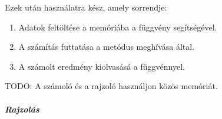 Ezek ut\'an haszn\'alatra k\'esz, amely sorrendje:
\begin{enumerate}
	\item Adatok felt\"olt\'ese a mem\'ori\'aba a  f\"uggv\'eny seg\'its\'eg\'evel.
	\item A sz\'am\'it\'as futtat\'asa a  met\'odus megh\'iv\'asa \'altal.
	\item A sz\'amolt eredm\'eny kiolvas\'as\'a a  f\"uggv\'ennyel.
\end{enumerate}
TODO: A sz\'amol\'o \'es a rajzol\'o haszn\'aljon k\"oz\"os mem\'ori\'at.


\subparagraph{Rajzol\'as}
